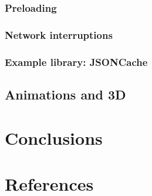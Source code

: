 \documentclass[a4paper,12pt]{article}
\begin{document}
\subsubsection{Preloading}
\subsubsection{Network interruptions}
\subsubsection{Example library: JSONCache}

\subsection{Animations and 3D}

\section{Conclusions}

\section{References}
\end{document}
